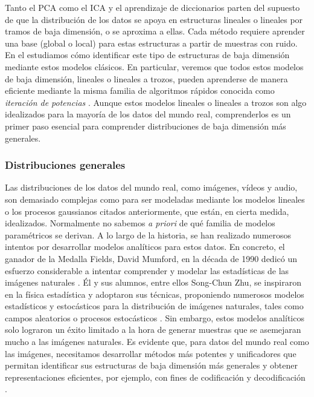 \documentclass[../../book-main_es.tex]{subfiles}
\begin{document}
Tanto el PCA como el ICA y el aprendizaje de diccionarios parten del supuesto de 
que la distribución de los datos se apoya en estructuras lineales o lineales por 
tramos de baja dimensión, o se aproxima a ellas. Cada método requiere aprender una base (global
o local) para estas estructuras a partir de muestras con ruido. En el  
estudiamos cómo identificar este tipo de estructuras de baja dimensión mediante estos 
modelos clásicos. En particular, veremos que todos estos modelos de baja dimensión, lineales o 
lineales a trozos, pueden aprenderse de manera eficiente mediante la misma familia 
de algoritmos rápidos conocida como \textit{iteración de potencias} \cite{Zhai-2020}. 
Aunque estos modelos lineales o lineales a trozos son algo idealizados para la 
mayoría de los datos del mundo real, comprenderlos es un primer paso esencial para
comprender distribuciones de baja dimensión más generales.

\subsubsection{Distribuciones generales}\label{sec:denoising-intro}

Las distribuciones de los datos del mundo real, como imágenes, vídeos y
audio, son demasiado complejas como para ser modeladas mediante los modelos lineales 
o los procesos gaussianos citados anteriormente, que están, en cierta medida,
idealizados. Normalmente no sabemos \textit{a priori} de qué familia de modelos paramétricos
se derivan. A lo largo de la historia, se han realizado numerosos intentos por desarrollar
modelos analíticos para estos datos. En concreto, el ganador de la Medalla Fields,
David Mumford, en la década de 1990 dedicó un esfuerzo considerable a intentar
comprender y modelar las estadísticas de las imágenes naturales
\cite{Mumford1996TheSD}. Él y sus alumnos, entre ellos Song-Chun
Zhu, se inspiraron en la física estadística y adoptaron sus técnicas, 
proponiendo numerosos modelos estadísticos y estocásticos para la distribución
de imágenes naturales, tales como campos aleatorios o procesos estocásticos
\cite{Zhu-Entropy-1997,Zhu1997LearningGP,Zhu1997Prior,Huang-Mumford,Mumford-1999,Lee-Mumford}.
Sin embargo, estos modelos analíticos solo lograron un éxito limitado a la hora de
generar muestras que se asemejaran mucho a las imágenes naturales. Es evidente que, para
datos del mundo real como las imágenes, necesitamos desarrollar métodos más potentes y
unificadores que permitan identificar sus estructuras de baja dimensión más generales y obtener
representaciones eficientes, por ejemplo,
con fines de codificación y decodificación \cite{ALLARD2012435,LITTLE2017504}.
\end{document}
